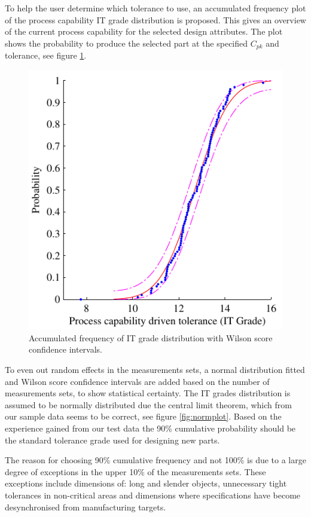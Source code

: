 \documentclass[aip,amsmath, reprint, author-year]{revtex4-1}
\begin{document}
To help the user determine which tolerance to use, an accumulated frequency plot of the process capability IT grade distribution is proposed. This gives an overview of the current process capability for the selected design attributes. The plot shows the probability to produce the selected part at the specified $C_{pk}$ and tolerance, see figure \ref{fig:acumfreq}.

\begin{figure}
\includegraphics{ITG_total.pdf}
\caption{\label{fig:acumfreq} Accumulated frequency of IT grade distribution with Wilson score confidence intervals.  }
\end{figure}

To even out random effects in the measurements sets, a normal distribution fitted and Wilson score confidence intervals are added based on the number of measurements sets, to show statistical certainty. The IT grades distribution is assumed to be normally distributed due the central limit theorem, which from our sample data seems to be correct, see figure \ref{fig:normplot}. Based on the experience gained from our test data the 90\% cumulative probability should be the standard tolerance grade used for designing new parts. 

The reason for choosing 90\% cumulative frequency and not 100\% is due to a large degree of exceptions in the upper 10\% of the measurements sets. These exceptions include dimensions of: long and slender objects, unnecessary tight tolerances in non-critical areas and dimensions where specifications have become desynchronised from manufacturing targets.
\end{document}
